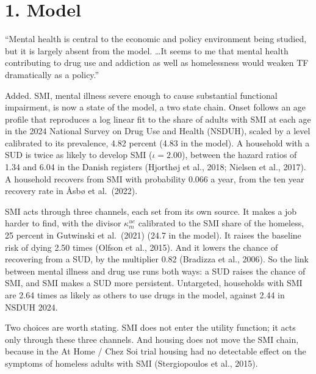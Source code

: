 \documentclass[11pt]{article}
\begin{document}
\section*{1. Model}

\begin{referee}
``Mental health is central to the economic and policy environment being studied,
but it is largely absent from the model. \dots It seems to me that mental health
contributing to drug use and addiction as well as homelessness would weaken TF
dramatically as a policy.''
\end{referee}
\begin{response}
Added. SMI, mental illness severe enough to cause substantial functional
impairment, is now a state of the model, a two state chain. Onset follows an age
profile that reproduces a log linear fit to the share of adults with SMI at each
age in the 2024 National Survey on Drug Use and Health (NSDUH), scaled by a level
calibrated to its prevalence, 4.82 percent (4.83 in the model). A household with a SUD is twice
as likely to develop SMI ($\iota=2.00$), between the hazard ratios of 1.34 and
6.04 in the Danish registers (Hjorth\o j et al., 2018; Nielsen et al., 2017). A
household recovers from SMI with probability 0.066 a year, from the ten year
recovery rate in {\AA}sb{\o} et al.\ (2022).

SMI acts through three channels, each set from its own source. It makes a job
harder to find, with the divisor $\kappa^{ue}_{m}$ calibrated to the SMI share of
the homeless, 25 percent in Gutwinski et al.\ (2021) (24.7 in the model). It
raises the baseline risk of dying 2.50 times (Olfson et al., 2015). And it lowers
the chance of recovering from a SUD, by the multiplier 0.82 (Bradizza et al.,
2006). So the link between mental illness and drug use runs both ways: a SUD
raises the chance of SMI, and SMI makes a SUD more persistent. Untargeted,
households with SMI are 2.64 times as likely as others to use drugs in the model,
against 2.44 in NSDUH 2024.

Two choices are worth stating. SMI does not enter the utility function; it acts
only through these three channels. And housing does not move the SMI chain,
because in the At Home / Chez Soi trial housing had no detectable effect on the
symptoms of homeless adults with SMI (Stergiopoulos et al., 2015).


\end{response}
\end{document}
